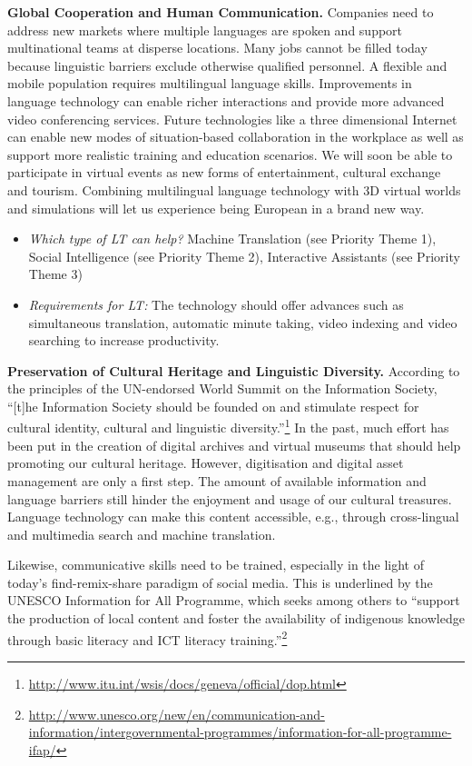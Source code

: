 \begin{multicols}{2}
\textbf{Global Cooperation and Human Communication.} Companies need to address new markets where multiple languages are spoken and support multinational teams at disperse locations. Many jobs cannot be filled today because linguistic barriers exclude otherwise qualified personnel. A flexible and mobile population requires multilingual language skills. Improvements in language technology can enable richer interactions and provide more advanced video conferencing services. Future technologies like a three dimensional Internet can enable new modes of situation-based collaboration in the workplace as well as support more realistic training and education scenarios. We will soon be able to participate in virtual events as new forms of entertainment, cultural exchange and tourism. Combining multilingual language technology with 3D virtual worlds and simulations will let us experience being European in a brand new way. 

\begin{itemize}
\item \emph{Which type of LT can help?} Machine Translation (see Priority Theme 1), Social Intelligence (see Priority Theme 2), Interactive Assistants (see Priority Theme 3)
\item \emph{Requirements for LT:} The technology should offer advances such as simultaneous translation, automatic minute taking, video indexing and video searching to increase productivity.
\end{itemize}

\textbf{Preservation of Cultural Heritage and Linguistic Diversity.} According to the principles of the UN-endorsed World Summit on the Information Society, “[t]he Information Society should be founded on and stimulate respect for cultural identity, cultural and linguistic diversity.”\footnote{\url{http://www.itu.int/wsis/docs/geneva/official/dop.html}} In the past, much effort has been put in the creation of digital archives and virtual museums that should help promoting our cultural heritage. However, digitisation and digital asset management are only a first step. The amount of available information and language barriers still hinder the enjoyment and usage of our cultural treasures. Language technology can make this content accessible, e.g., through cross-lingual and multimedia search and machine translation.

Likewise, communicative skills need to be trained, especially in the light of today’s find-remix-share paradigm of social media. This is underlined by the UNESCO Information for All Programme, which seeks among others to “support the production of local content and foster the availability of indigenous knowledge through basic literacy and ICT literacy training.”\footnote{\url{http://www.unesco.org/new/en/communication-and-information/intergovernmental-programmes/information-for-all-programme-ifap/}}


\end{multicols}
